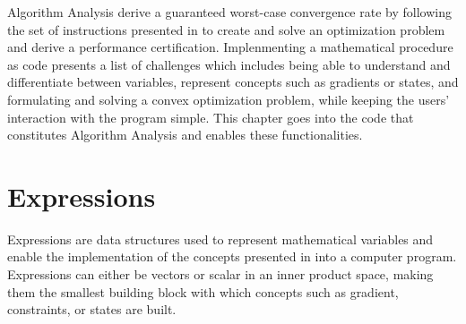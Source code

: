  

Algorithm Analysis derive a guaranteed worst-case convergence rate by following the set of instructions presented in to create and solve an optimization problem and derive a performance certification. Implenmenting a mathematical procedure as code presents a list of challenges which includes being able to understand and differentiate between variables, represent concepts such as gradients or states, and formulating and solving a convex optimization problem, while keeping the users' interaction with the program simple. This chapter goes into the code that constitutes Algorithm Analysis and enables these functionalities.

\section{Expressions}

Expressions are data structures used to represent mathematical variables and enable the implementation of the concepts presented in  into a computer program. Expressions can either be vectors or scalar in an inner product space, making them the smallest building block with which concepts such as gradient, constraints, or states are built.

